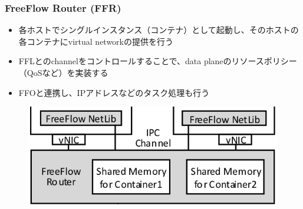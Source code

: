 \documentclass[dvipdfmx,9pt,notheorems]{beamer}
\theoremstyle{definition}
\begin{document}
\begin{frame}\frametitle{FreeFlow Router (FFR)}
	\begin{itemize}
		\item 各ホストでシングルインスタンス（コンテナ）として起動し、そのホストの各コンテナにvirtual networkの提供を行う
		\item FFLとのchannelをコントロールすることで、data planeのリソースポリシー（QoSなど）を実装する
		\item FFOと連携し、IPアドレスなどのタスク処理も行う
  \end{itemize}
  \begin{figure}[htb]
    \centering
    \includegraphics[scale=1]{fig/figure4-ffr.png}
  \end{figure}
\end{frame}
\end{document}
